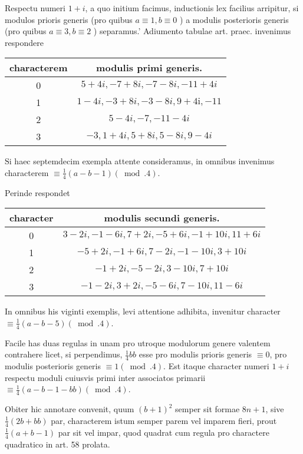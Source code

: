 \documentclass[10pt]{article}
\begin{document}
Respectu numeri \(1+i\), a quo initium facimus, inductionis lex facilius arripitur, si modulos prioris generis (pro quibus \(a \equiv 1, b \equiv 0\) ) a modulis posterioris generis (pro quibus \(a \equiv 3, b \equiv 2\) ) separamus.' Adiumento tabulae art. praec. invenimus respondere

\begin{center}
\begin{tabular}{c|c}
characterem & modulis primi generis. \\
\hline
0 & \(5+4 i,-7+8 i,-7-8 i,-11+4 i\) \\
1 & \(1-4 i,-3+8 i,-3-8 i, 9+4 \mathrm{i},-11\) \\
2 & \(5-4 i,-7,-11-4 i\) \\
3 & \(-3,1+4 i, 5+8 i, 5-8 i, 9-4 i\) \\
\end{tabular}
\end{center}

\(\mathrm{Si}\) haec septemdecim exempla attente consideramus, in omnibus invenimus characterem \(\equiv \frac{1}{4}(a-b-1)(\bmod .4)\).

Perinde respondet

\begin{center}
\begin{tabular}{c|c}
character & modulis secundi generis. \\
\hline
0 & \(3-2 i,-1-6 i, 7+2 i,-5+6 i,-1+10 i, 11+6 i\) \\
1 & \(-5+2 i,-1+6 i, 7-2 i,-1-10 i, 3+10 i\) \\
2 & \(-1+2 i,-5-2 i, 3-10 i, 7+10 i\) \\
3 & \(-1-2 i, 3+2 i,-5-6 i, 7-10 i, 11-6 i\) \\
\end{tabular}
\end{center}

In omnibus his viginti exemplis, levi attentione adhibita, invenitur character \(\equiv \frac{1}{4}(a-b-5)(\bmod .4)\).

Facile has duas regulas in unam pro utroque modulorum genere valentem contrahere licet, si perpendimus, \(\frac{1}{4} b b\) esse pro modulis prioris generis \(\equiv 0\), pro modulis posterioris generis \(\equiv 1(\bmod .4)\). Est itaque character numeri \(1+i\) respectu moduli cuiusvis primi inter associatos primarii \(\equiv \frac{1}{4}(a-b-1-b b)(\bmod .4)\).

Obiter hic annotare convenit, quum \((b+1)^{2}\) semper sit formae \(8 n+1\), sive \(\frac{1}{4}(2 b+b b)\) par, characterem istum semper parem vel imparem fieri, prout \(\frac{1}{4}(a+b-1)\) par sit vel impar, quod quadrat cum regula pro charactere quadratico in art. 58 prolata.
\end{document}
